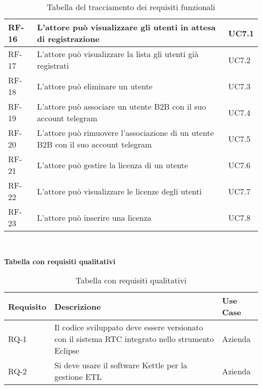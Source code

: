 \begin{table}
\begin{tabular}{ |p{2cm}|p{8cm}|p{2cm}| }
 \hline
   RF-16     & L'attore può visualizzare gli utenti in attesa di registrazione   & UC7.1 \\
\hline
RF-17   & L'attore può visualizzare la lista gli utenti già registrati   & UC7.2 \\
\hline
RF-18   & L'attore può eliminare un utente  & UC7.3 \\
\hline
RF-19   &  L'attore può associare un utente B2B con il suo account telegram  & UC7.4 \\
\hline
RF-20  &  L'attore può rimuovere l'associazione di un utente B2B con il suo account telegram & UC7.5 \\
\hline
RF-21   &  L'attore può gestire la licenza di un utente  & UC7.6 \\
\hline
RF-22   &  L'attore può visualizzare le licenze degli utenti & UC7.7 \\
\hline
RF-23   & L'attore può inserire una  licenza  & UC7.8 \\
\hline
\end{tabular}
\\
\caption{Tabella del tracciamento dei requisiti funzionali}
\end{table}



\begin{table}
\begin{center}
\textbf{Tabella con requisiti qualitativi}
\end{center}
\begin{tabular}{ |p{2cm}|p{8cm}|p{2cm}| }
 \hline
\textbf{ Requisito}   &  \textbf{Descrizione}    &  \textbf{    Use Case} \\ 
\hline
RQ-1  &  Il codice sviluppato deve essere versionato con il sistema RTC integrato nello strumento Eclipse & Azienda \\
\hline
RQ-2 &  Si deve usare il software Kettle per la gestione ETL & Azienda \\
\hline
\end{tabular}
\\
\caption{Tabella con requisiti qualitativi}
\end{table}




